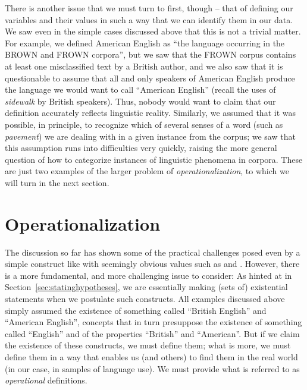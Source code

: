 There is another issue that we must turn to first, though -- that of defining our variables and their values in such a way that we can identify them in our data. We saw even in the simple cases discussed above that this is not a trivial matter. For example, we defined American  English as ``the language occurring in the BROWN  and FROWN  corpora'', but we saw that the FROWN corpus contains at least one misclassified text by a British  author, and we also saw that it is questionable to assume that all and only speakers of American English produce the language we would want to call ``American English'' (recall the uses of \textit{sidewalk} by British speakers). Thus, nobody would want to claim that our definition accurately reflects linguistic reality. Similarly, we assumed that it was possible, in principle, to recognize which of several senses of a word (such as \textit{pavement}) we are dealing with in a given instance from the corpus; we saw that this assumption runs into difficulties very quickly, raising the more general question of how to categorize  instances of linguistic phenomena in corpora. These are just two examples of the larger problem of \textit{operationalization},  to which we will turn in the next section.

\section{Operationalization}
\label{sec:operationalization}

The discussion so far has shown some of the practical challenges posed even by a simple construct like   with seemingly obvious values such as   and . However, there is a more fundamental, and more challenging issue to consider: As hinted at in Section~\ref{sec:statinghypotheses}, we are essentially making (sets of) existential statements when we postulate such constructs. All examples discussed above simply assumed the existence of something called ``British English'' and ``American  English'', concepts that in turn presuppose the existence of something called ``English'' and of the properties ``British'' and ``American''.  But if we claim the existence of these constructs, we must define them; what is more, we must define them in a way that enables us (and others) to find them in the real world (in our case, in samples of language use). We must provide what is referred to as \emph{operational}  definitions.

